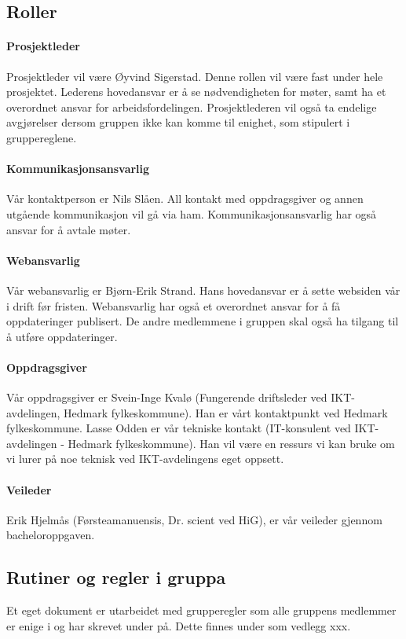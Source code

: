\subsection{Roller}
\paragraph{Prosjektleder}
Prosjektleder vil være Øyvind Sigerstad. Denne rollen vil være fast under hele prosjektet. Lederens hovedansvar er å se nødvendigheten for møter, samt ha et overordnet ansvar for arbeidsfordelingen. Prosjektlederen vil også ta endelige avgjørelser dersom gruppen ikke kan komme til enighet, som stipulert i gruppereglene.

\paragraph{Kommunikasjonsansvarlig}
Vår kontaktperson er Nils Slåen. All kontakt med oppdragsgiver og annen utgående kommunikasjon vil gå via ham. Kommunikasjonsansvarlig har også ansvar for å avtale møter.

\paragraph{Webansvarlig}
Vår webansvarlig er Bjørn-Erik Strand. Hans hovedansvar er å sette websiden vår i drift før fristen. Webansvarlig har også et overordnet ansvar for å få oppdateringer publisert. De andre medlemmene i gruppen skal også ha tilgang til å utføre oppdateringer.

\paragraph{Oppdragsgiver}
Vår oppdragsgiver er Svein-Inge Kvalø (Fungerende driftsleder ved IKT-avdelingen, Hedmark fylkeskommune). Han er vårt kontaktpunkt ved Hedmark fylkeskommune. Lasse Odden er vår tekniske kontakt (IT-konsulent ved IKT-avdelingen - Hedmark fylkeskommune). Han vil være en ressurs vi kan bruke om vi lurer på noe teknisk ved IKT-avdelingens eget oppsett.

\paragraph{Veileder}
Erik Hjelmås (Førsteamanuensis, Dr. scient ved HiG), er vår veileder gjennom bacheloroppgaven.

\subsection{Rutiner og regler i gruppa}
Et eget dokument er utarbeidet med grupperegler som alle gruppens medlemmer er enige i og har skrevet under på. Dette finnes under som vedlegg xxx.

